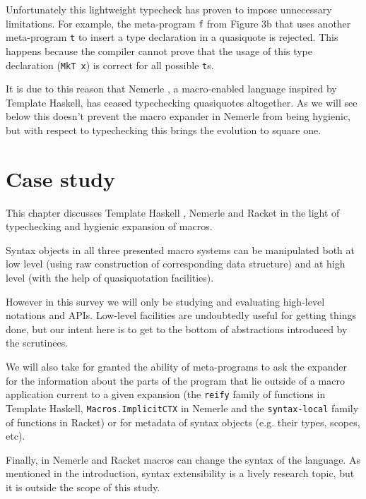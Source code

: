 \documentclass[10pt,journal,a4paper]{IEEEtran}
\begin{document}
Unfortunately this lightweight typecheck has proven to impose unnecessary limitations.
For example, the meta-program \small \texttt{f} \normalsize from Figure 3b
that uses another meta-program \small \texttt{t} \normalsize to insert a type declaration
in a quasiquote is rejected. This happens because the compiler cannot prove that
the usage of this type declaration (\small \texttt{MkT x}\normalsize)
is correct for all possible \small \texttt{t}\normalsize s.

It is due to this reason that Nemerle \cite{skalski05, skalski04},
a macro-enabled language inspired by Template Haskell,
has ceased typechecking quasiquotes altogether. As we will see below this doesn't prevent
the macro expander in Nemerle from being hygienic, but with respect to typechecking
this brings the evolution to square one.

\section{Case study}

This chapter discusses Template Haskell \cite{sheard02},
Nemerle \cite{skalski04,skalski05} and Racket \cite{barzilay11,flatt10}
in the light of typechecking and hygienic expansion of macros.

Syntax objects in all three presented macro systems can be manipulated
both at low level (using raw construction of corresponding data structure)
and at high level (with the help of quasiquotation facilities).

However in this survey we will only be studying and evaluating high-level notations and APIs.
Low-level facilities are undoubtedly useful for getting things done,
but our intent here is to get to the bottom of abstractions
introduced by the scrutinees.

We will also take for granted the ability of meta-programs to ask the expander
for the information about the parts of the program that lie outside of
a macro application current to a given expansion (the \small \texttt{reify} \normalsize family of functions
in Template Haskell, \small \texttt{Macros.ImplicitCTX} \normalsize in Nemerle and the
\small \texttt{syntax-local} \normalsize family of functions in Racket) or
for metadata of syntax objects (e.g. their types, scopes, etc).

Finally, in Nemerle and Racket macros can change the syntax of the language.
As mentioned in the introduction, syntax extensibility is a lively
research topic, but it is outside the scope of this study.
\end{document}
